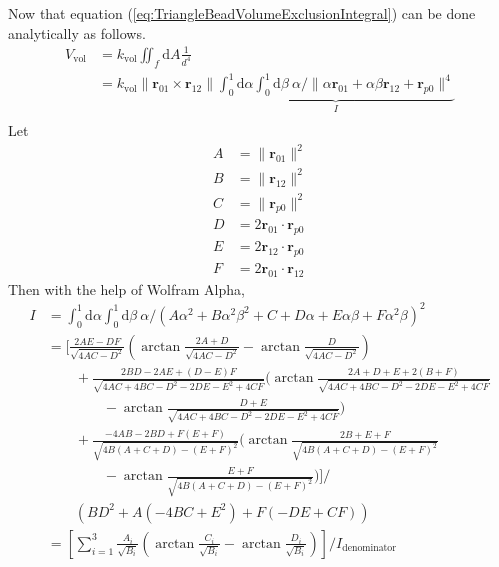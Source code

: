 \documentclass[main.tex]{subfiles}
\begin{document}
Now that equation (\ref{eq:TriangleBeadVolumeExclusionIntegral}) can be done analytically as follows.
\begin{equation}
\begin{aligned}
V_\text{vol} &= k_\text{vol} \iint_f \mathrm{d}A \frac1{d^4}\\
&= k_\text{vol} \| \bm{r}_{01} \times \bm{r}_{12} \| \underbrace{\int_0^1 \mathrm{d}\alpha \int_0^1 \mathrm{d}\beta \ \alpha / \| \alpha\bm{r}_{01} + \alpha\beta\bm{r}_{12} + \bm{r}_{p0} \|^4}_I\\
\end{aligned}
\label{eq:TriangleBeadVolumeExclusionIntegralExpanded}
\end{equation}
Let
\begin{equation}
\begin{aligned}
A &= \|\bm{r}_{01}\|^2\\
B &= \|\bm{r}_{12}\|^2\\
C &= \|\bm{r}_{p0}\|^2\\
D &= 2\bm{r}_{01}\cdot\bm{r}_{p0}\\
E &= 2\bm{r}_{12}\cdot\bm{r}_{p0}\\
F &= 2\bm{r}_{01}\cdot\bm{r}_{12}
\end{aligned}
\end{equation}
Then with the help of Wolfram Alpha,
\begin{equation}
\begin{aligned}
I &= \int_0^1 \mathrm{d}\alpha \int_0^1 \mathrm{d}\beta \ \alpha / \left( A\alpha^2 + B\alpha^2\beta^2 + C + D\alpha + E\alpha\beta + F\alpha^2\beta \right)^2\\
&= \Biggl[ \frac{2AE-DF}{\sqrt{4AC-D^2}} \left( \arctan\frac{2A+D}{\sqrt{4AC-D^2}} - \arctan\frac{D}{\sqrt{4AC-D^2}} \right)\\
&  \qquad + \frac{2BD-2AE+(D-E)F}{\sqrt{4AC+4BC-D^2-2DE-E^2+4CF}} \biggl( \arctan\frac{2A+D+E+2(B+F)}{\sqrt{4AC+4BC-D^2-2DE-E^2+4CF}}\\
&  \qquad \qquad - \arctan\frac{D+E}{\sqrt{4AC+4BC-D^2-2DE-E^2+4CF}} \biggr)\\
&  \qquad + \frac{-4AB-2BD+F(E+F)}{\sqrt{4B(A+C+D)-(E+F)^2}} \biggl( \arctan\frac{2B+E+F}{\sqrt{4B(A+C+D)-(E+F)^2}}\\
&  \qquad \qquad - \arctan\frac{E+F}{\sqrt{4B(A+C+D)-(E+F)^2}} \biggr)\Biggr] / \\
&  \qquad \left( BD^2 + A(-4BC+E^2) + F(-DE+CF) \right)\\
&= \left[ \sum_{i=1}^3 \frac{A_i}{\sqrt{B_i}} \left( \arctan\frac{C_i}{\sqrt{B_i}} - \arctan\frac{D_i}{\sqrt{B_i}} \right) \right] / I_\text{denominator}\\
\end{aligned}
\end{equation}
\end{document}
